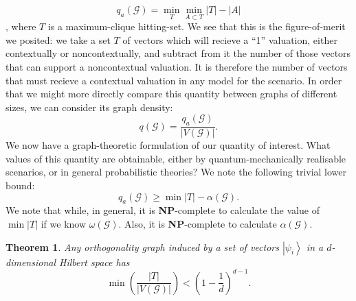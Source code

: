 \documentclass{amsart}
\newtheorem{thm}{Theorem}
\theoremstyle{definition}
\newcommand{\ket}[1]{{\left\vert{#1}\right\rangle}}
\begin{document}
\begin{equation}q_a(\mathcal{G})=\min_T \min_{A\subset T} |T|-|A|\end{equation},
where $T$ is a maximum-clique hitting-set. We see that this is the figure-of-merit we posited: we take a set $T$ of vectors which will recieve a ``1'' valuation, either contextually or noncontextually, and subtract from it the number of those vectors that can support a noncontextual valuation. It is therefore the number of vectors that must recieve a contextual valuation in any model for the scenario. In order that we might more directly compare this quantity between graphs of different sizes, we can consider its graph density:
\begin{equation}
q(\mathcal{G})=\frac{q_a(\mathcal{G})}{|V(\mathcal{G})|}.
\end{equation}
We now have a graph-theoretic formulation of our quantity of interest. What values of this quantity are obtainable, either by quantum-mechanically realisable scenarios, or in general probabilistic theories? We note the following trivial lower bound:
\begin{equation}
q_a(\mathcal{G})\geq \min |T|-\alpha(\mathcal{G}).
\end{equation}
We note that while, in general, it is \textbf{NP}-complete to calculate the value of $\min |T|$ if we know $\omega(\mathcal{G})$. Also, it is \textbf{NP}-complete to calculate $\alpha(\mathcal{G})$. %
\begin{thm}
Any orthogonality graph induced by a set of vectors $\ket{\psi_i}$ in a $d$-dimensional Hilbert space has
\begin{equation}
\min \left(\frac{|T|}{|V(\mathcal{G})|}\right) < \left(1-\frac1d\right)^{d-1}.
\end{equation}
\end{thm}
\end{document}
